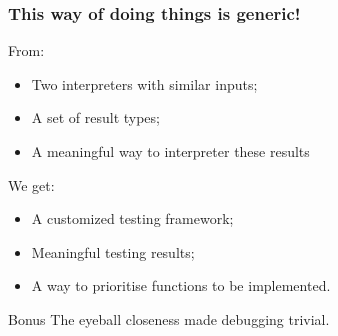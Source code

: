 \documentclass{beamer}
\begin{document}
\begin{frame}
    \frametitle{This way of doing things is generic!}

    From:
    \begin{itemize}
        \item Two interpreters with similar inputs;
        \item A set of result types;
        \item A meaningful way to interpreter these results
    \end{itemize}
    We get:
    \begin{itemize}
        \item A customized testing framework;
        \item Meaningful testing results;
        \item A way to prioritise functions to be implemented.
    \end{itemize}

    \pause
    \vfill
    \begin{block}{Bonus}
        The eyeball closeness made debugging trivial.
    \end{block}

\end{frame}
\end{document}
